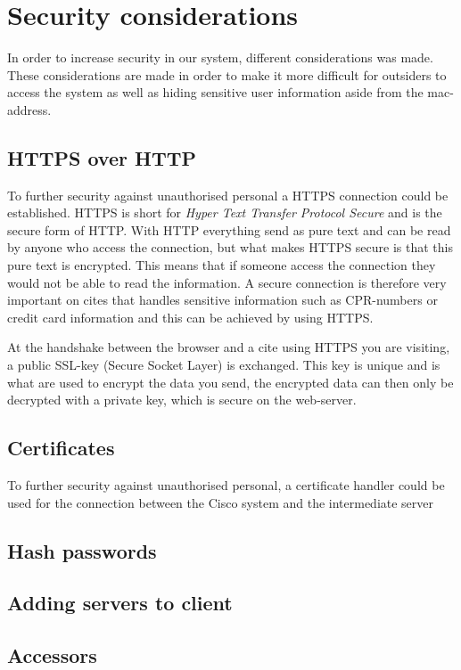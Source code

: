 \section{Security considerations}
In order to increase security in our system, different considerations was made. These considerations are made in order to make it more difficult for outsiders to access the system as well as hiding sensitive user information aside from the mac-address.

\subsection*{HTTPS over HTTP} 
To further security against unauthorised personal a HTTPS connection could be established. HTTPS is short for \textit{Hyper Text Transfer Protocol Secure} and is the secure form of HTTP. With HTTP everything send as pure text and can be read by anyone who access the connection, but what makes HTTPS secure is that this pure text is encrypted. This means that if someone access the connection they would not be able to read the information. A secure connection is therefore very important on cites that handles sensitive information such as CPR-numbers or credit card information and this can be achieved by using HTTPS\cite{HTTPS}.

At the handshake between the browser and a cite using HTTPS you are visiting, a public SSL-key (Secure Socket Layer) is exchanged. This key is unique and is what are used to encrypt the data you send, the encrypted data can then only be decrypted with a private key, which is secure on the web-server\cite{HTTPS}.

\subsection*{Certificates}
To further security against unauthorised personal, a certificate handler could be used for the connection between the Cisco system and the intermediate server  

\subsection*{Hash passwords}
\subsection*{Adding servers to client}
\subsection*{Accessors}
